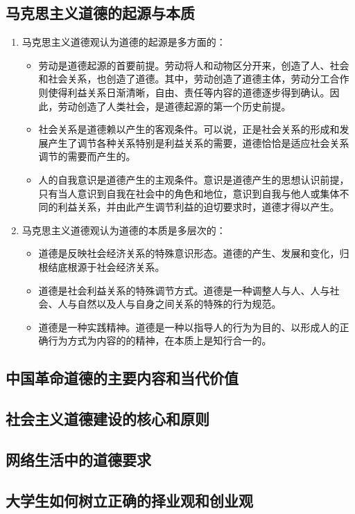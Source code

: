 \subsection{马克思主义道德的起源与本质}
\begin{enumerate}
\item 马克思主义道德观认为道德的起源是多方面的：
\begin{itemize}
\item 劳动是道德起源的首要前提。劳动将人和动物区分开来，创造了人、社会和社会关系，也创造了道德。其中，劳动创造了道德主体，劳动分工合作则使得利益关系日渐清晰，自由、责任等内容的道德逐步得到确认。因此，劳动创造了人类社会，是道德起源的第一个历史前提。
\item 社会关系是道德赖以产生的客观条件。可以说，正是社会关系的形成和发展产生了调节各种关系特别是利益关系的需要，道德恰恰是适应社会关系调节的需要而产生的。
\item 人的自我意识是道德产生的主观条件。意识是道德产生的思想认识前提，只有当人意识到自我在社会中的角色和地位，意识到自我与他人或集体不同的利益关系，并由此产生调节利益的迫切要求时，道德才得以产生。
\end{itemize}
\item 马克思主义道德观认为道德的本质是多层次的：
\begin{itemize}
\item 道德是反映社会经济关系的特殊意识形态。道德的产生、发展和变化，归根结底根源于社会经济关系。
\item 道德是社会利益关系的特殊调节方式。道德是一种调整人与人、人与社会、人与自然以及人与自身之间关系的特殊的行为规范。
\item 道德是一种实践精神。道德是一种以指导人的行为为目的、以形成人的正确行为方式为内容的的精神，在本质上是知行合一的。
\end{itemize}
\end{enumerate}

\subsection{中国革命道德的主要内容和当代价值}
\subsection{社会主义道德建设的核心和原则}
\subsection{网络生活中的道德要求}
\subsection{大学生如何树立正确的择业观和创业观}
